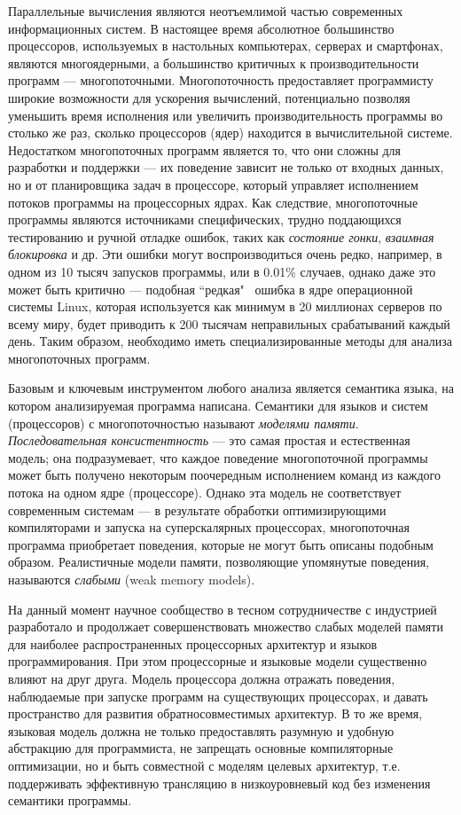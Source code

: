 
{\actuality}
Параллельные вычисления являются неотъемлимой частью современных
информационных систем. В настоящее время абсолютное большинство процессоров, используемых
в настольных компьютерах, серверах и смартфонах, являются многоядерными,
а большинство критичных к производительности программ --- многопоточными.
Многопоточность предоставляет программисту широкие возможности для ускорения вычислений,
потенциально позволяя уменьшить время исполнения или увеличить производительность программы
во столько же раз, сколько процессоров (ядер) находится в вычислительной системе.
Недостатком многопоточных программ является то, что они сложны для разработки и поддержки --- их поведение
зависит не только от входных данных, но и от планировщика задач в процессоре, который
управляет исполнением потоков программы на процессорных ядрах.
Как следствие, многопоточные программы являются источниками специфических, трудно поддающихся
тестированию и ручной отладке ошибок, таких как \emph{состояние гонки}, \emph{взаимная блокировка} и др.
Эти ошибки могут воспроизводиться очень редко, например, в одном из 10 тысяч запусков
программы, или в 0.01\% случаев, однако даже это может быть критично ---
подобная ``редкая" \, ошибка в ядре операционной системы Linux, которая
используется как минимум в 20 миллионах серверов по всему миру, будет приводить
к 200 тысячам неправильных срабатываний каждый день.
Таким образом, необходимо иметь специализированные методы для анализа многопоточных программ.

Базовым и ключевым инструментом любого анализа является семантика языка,
на котором анализируемая программа написана. Семантики для языков и систем (процессоров)
с многопоточностью называют \emph{моделями памяти}.
\emph{Последовательная консистентность} --- это самая простая и естественная модель;
она подразумевает, что каждое поведение многопоточной программы может быть
получено некоторым поочередным исполнением команд из каждого потока на одном ядре
(процессоре). Однако эта модель не соответствует современным системам ---
в результате обработки оптимизирующими компиляторами и запуска на суперскалярных 
процессорах, многопоточная программа приобретает поведения, которые не могут
быть описаны подобным образом. Реалистичные модели памяти, позволяющие
упомянутые поведения, называются \emph{слабыми} (weak memory models).

На данный момент научное сообщество в тесном сотрудничестве с индустрией
разработало и продолжает совершенствовать множество слабых моделей памяти для
наиболее распространенных процессорных архитектур и языков программирования.
При этом процессорные и языковые модели существенно влияют на друг друга.
Модель процессора должна отражать поведения, наблюдаемые при запуске программ
на существующих процессорах, и давать пространство для развития
обратносовместимых архитектур. В то же время, языковая модель должна не только
предоставлять разумную и удобную абстракцию для программиста, не запрещать основные
компиляторные оптимизации, но и быть совместной с моделям целевых архитектур,
т.е. поддерживать эффективную трансляцию в низкоуровневый код без изменения
семантики программы.

